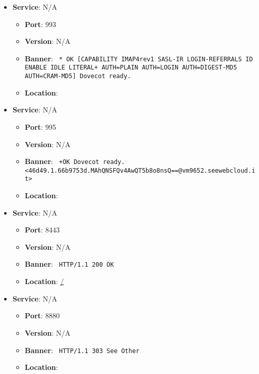 \documentclass{article}
\begin{document}
\begin{itemize}
        \item \textbf{Service}: N/A
        \begin{itemize}
            \item \textbf{Port}: 993
            \item \textbf{Version}:  N/A 
            \item \textbf{Banner}: \texttt{ * OK [CAPABILITY IMAP4rev1 SASL-IR LOGIN-REFERRALS ID ENABLE IDLE LITERAL+ AUTH=PLAIN AUTH=LOGIN AUTH=DIGEST-MD5 AUTH=CRAM-MD5] Dovecot ready. }
            \item \textbf{Location}: \href{  }{  }
        \end{itemize}
    
        \item \textbf{Service}: N/A
        \begin{itemize}
            \item \textbf{Port}: 995
            \item \textbf{Version}:  N/A 
            \item \textbf{Banner}: \texttt{ +OK Dovecot ready. <46d49.1.66b9753d.MAhQNSFQv4AwQT5b8o8nsQ==@vm9652.seewebcloud.it> }
            \item \textbf{Location}: \href{  }{  }
        \end{itemize}
    
        \item \textbf{Service}: N/A
        \begin{itemize}
            \item \textbf{Port}: 8443
            \item \textbf{Version}:  N/A 
            \item \textbf{Banner}: \texttt{ HTTP/1.1 200 OK
 }
            \item \textbf{Location}: \href{ / }{ / }
        \end{itemize}
    
        \item \textbf{Service}: N/A
        \begin{itemize}
            \item \textbf{Port}: 8880
            \item \textbf{Version}:  N/A 
            \item \textbf{Banner}: \texttt{ HTTP/1.1 303 See Other
 }
            \item \textbf{Location}: \href{  }{  }
        \end{itemize}
    
\end{itemize}
\end{document}
